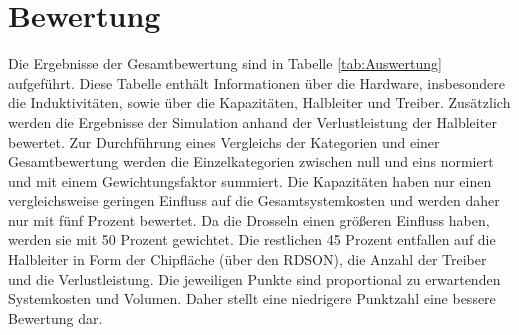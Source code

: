 \section{Bewertung}
Die Ergebnisse der Gesamtbewertung sind in Tabelle \ref{tab:Auswertung} aufgeführt. Diese Tabelle enthält Informationen über die Hardware, insbesondere die Induktivitäten, sowie über die Kapazitäten, Halbleiter und Treiber. Zusätzlich werden die Ergebnisse der Simulation anhand der Verlustleistung der Halbleiter bewertet.  Zur Durchführung eines Vergleichs der Kategorien und einer Gesamtbewertung werden die Einzelkategorien zwischen null und eins normiert und mit einem Gewichtungsfaktor summiert. Die Kapazitäten haben nur einen vergleichsweise geringen Einfluss auf die Gesamtsystemkosten und werden daher nur mit fünf Prozent bewertet. Da die Drosseln einen größeren Einfluss haben, werden sie mit 50 Prozent gewichtet. Die restlichen 45 Prozent entfallen auf die Halbleiter in Form der Chipfläche (über den RDSON), die Anzahl der Treiber und die Verlustleistung. Die jeweiligen Punkte sind proportional zu erwartenden Systemkosten und Volumen. Daher stellt eine niedrigere Punktzahl eine bessere Bewertung dar. \\
